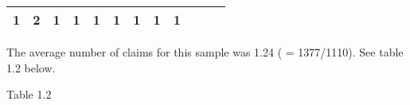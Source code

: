 \documentclass[]{book}
\newenvironment{Shaded}{\begin{snugshade}}{\end{snugshade}}
\newcommand{\KeywordTok}[1]{\textcolor[rgb]{0.13,0.29,0.53}{\textbf{#1}}}
\newcommand{\DecValTok}[1]{\textcolor[rgb]{0.00,0.00,0.81}{#1}}
\newcommand{\OperatorTok}[1]{\textcolor[rgb]{0.81,0.36,0.00}{\textbf{#1}}}
\newcommand{\NormalTok}[1]{#1}
\theoremstyle{definition}
\theoremstyle{definition}
\theoremstyle{definition}
\theoremstyle{remark}
\begin{document}
\begin{longtable}[]{@{}cccccccccccc@{}}
\begin{minipage}[t]{0.04\columnwidth}
1\strut
\end{minipage} & \begin{minipage}[t]{0.04\columnwidth}\centering\strut
2\strut
\end{minipage} & \begin{minipage}[t]{0.04\columnwidth}\centering\strut
1\strut
\end{minipage} & \begin{minipage}[t]{0.04\columnwidth}\centering\strut
1\strut
\end{minipage} & \begin{minipage}[t]{0.04\columnwidth}\centering\strut
1\strut
\end{minipage} & \begin{minipage}[t]{0.04\columnwidth}\centering\strut
1\strut
\end{minipage} & \begin{minipage}[t]{0.04\columnwidth}\centering\strut
1\strut
\end{minipage} & \begin{minipage}[t]{0.05\columnwidth}\centering\strut
1\strut
\end{minipage} & \begin{minipage}[t]{0.05\columnwidth}\centering\strut
1\strut
\end{minipage}\tabularnewline
\bottomrule
\end{longtable}

The average number of claims for this sample was 1.24 ( = 1377/1110).
See table 1.2 below.

Table 1.2

\begin{Shaded}
\end{Shaded}
\end{document}
